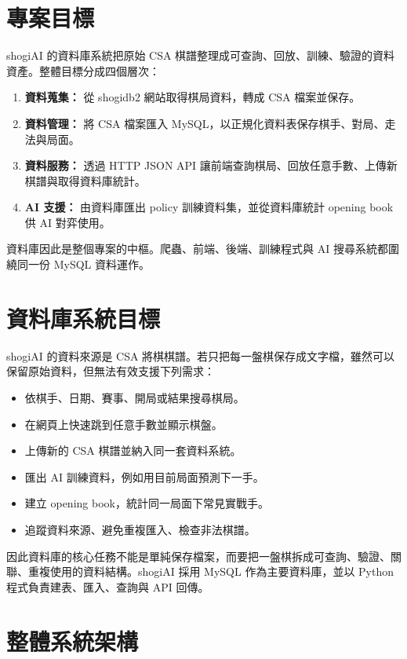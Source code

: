 \documentclass[12pt,a4paper,fontset=none]{ctexart}
\begin{document}
\section{專案目標}

shogiAI 的資料庫系統把原始 CSA 棋譜整理成可查詢、回放、訓練、驗證的資料資產。整體目標分成四個層次：

\begin{enumerate}
  \item \textbf{資料蒐集：} 從 shogidb2 網站取得棋局資料，轉成 CSA 檔案並保存。
  \item \textbf{資料管理：} 將 CSA 檔案匯入 MySQL，以正規化資料表保存棋手、對局、走法與局面。
  \item \textbf{資料服務：} 透過 HTTP JSON API 讓前端查詢棋局、回放任意手數、上傳新棋譜與取得資料庫統計。
  \item \textbf{AI 支援：} 由資料庫匯出 policy 訓練資料集，並從資料庫統計 opening book 供 AI 對弈使用。
\end{enumerate}

資料庫因此是整個專案的中樞。爬蟲、前端、後端、訓練程式與 AI 搜尋系統都圍繞同一份 MySQL 資料運作。

\section{資料庫系統目標}

shogiAI 的資料來源是 CSA 將棋棋譜。若只把每一盤棋保存成文字檔，雖然可以保留原始資料，但無法有效支援下列需求：

\begin{itemize}
  \item 依棋手、日期、賽事、開局或結果搜尋棋局。
  \item 在網頁上快速跳到任意手數並顯示棋盤。
  \item 上傳新的 CSA 棋譜並納入同一套資料系統。
  \item 匯出 AI 訓練資料，例如用目前局面預測下一手。
  \item 建立 opening book，統計同一局面下常見實戰手。
  \item 追蹤資料來源、避免重複匯入、檢查非法棋譜。
\end{itemize}

因此資料庫的核心任務不能是單純保存檔案，而要把一盤棋拆成可查詢、驗證、關聯、重複使用的資料結構。shogiAI 採用 MySQL 作為主要資料庫，並以 Python 程式負責建表、匯入、查詢與 API 回傳。

\section{整體系統架構}
\end{document}
